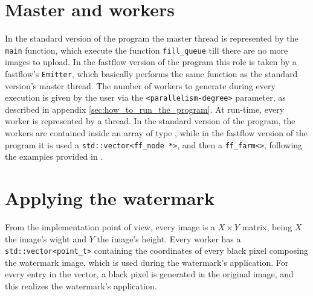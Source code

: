     \section{Master and workers} %
    \label{sec:master_and_workers}
        In the standard version of the program the master thread is represented by the \texttt{main} function,
        which execute the function \texttt{fill\_queue} till there are no more images to upload. In the fastflow
        version of the program this role is taken by a fastflow's \texttt{Emitter}, which basically performs
        the same function as the standard version's master thread.
        The number of workers to generate during every execution is given by the user via the
        \texttt{<parallelism-degree>} parameter, as described in appendix \ref{sec:how_to_run_the_program}. At
        run-time, every worker is represented by a thread. In the standard version of the program, the workers
        are contained inside an array of type , while in the fastflow version of the program
        it is used a \texttt{std::vector<ff\_node *>}, and then a \texttt{ff\_farm<>}, following the examples
        provided in \cite{DSPM}.
    \section{Applying the watermark} %
    \label{sec:applying_the_watermark}
        From the implementation point of view, every image is a $X{\times}Y$ matrix, being $X$ the image's wight
        and $Y$ the image's height. Every worker has a \texttt{std::vector<point\_t>} containing the coordinates
        of every black pixel composing the watermark image, which is used during the watermark's application.
        For every entry in the vector, a black pixel is generated in the original image, and this
        realizes the watermark's application.
